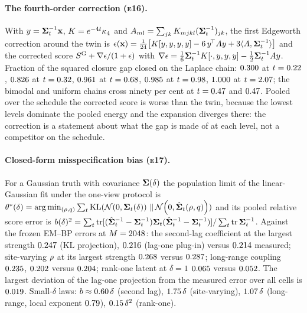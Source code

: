 \paragraph{The fourth-order correction (\textsc{e16}).}
With $y=\mathbf{\Sigma}_t^{-1}\mathbf{x}$, $K=e^{-4t}\kappa_4$ and $A_{ml}=\sum_{jk}K_{mjkl}(\mathbf{\Sigma}_t^{-1})_{jk}$,
the first Edgeworth correction around the twin is
$\epsilon(\mathbf{x})=\tfrac1{24}\bigl[K[y,y,y,y]-6\,y^{\!\top}Ay+3\langle A,\mathbf{\Sigma}_t^{-1}\rangle\bigr]$
and the corrected score $S^{\mathrm{G}}+\nabla\epsilon/(1+\epsilon)$ with
$\nabla\epsilon=\tfrac16\mathbf{\Sigma}_t^{-1}K[\cdot,y,y,y]-\tfrac12\mathbf{\Sigma}_t^{-1}Ay$. Fraction of the
squared closure gap closed on the Laplace chain: $0.300$ at
$t=0.22$, $0.826$ at
$t=0.32$, $0.961$ at
$t=0.68$, $0.985$ at
$t=0.98$, $1.000$ at
$t=2.07$; the bimodal and uniform chains cross ninety per cent at
$t=0.47$ and $0.47$. Pooled over the
schedule the corrected score is worse than the twin, because the lowest levels dominate
the pooled energy and the expansion diverges there: the correction is a statement about
what the gap is made of at each level, not a competitor on the schedule.

\paragraph{Closed-form misspecification bias (\textsc{e17}).}
For a Gaussian truth with covariance $\mathbf{\Sigma}(\delta)$ the population limit of the
linear-Gaussian fit under the one-view protocol is
$\theta^\ast(\delta)=\arg\min_{(\rho,q)}\sum_t\mathrm{KL}(\mathcal{N}\!\left(0,\mathbf{\Sigma}_t(\delta)\right)\,\|\,\mathcal{N}\!\left(0,\hat{\mathbf{\Sigma}}_t(\rho,q)\right))$
and its pooled relative score error is
$b(\delta)^2=\sum_t\operatorname{tr}[(\hat{\mathbf{\Sigma}}_t^{-1}-\mathbf{\Sigma}_t^{-1})\mathbf{\Sigma}_t(\hat{\mathbf{\Sigma}}_t^{-1}-\mathbf{\Sigma}_t^{-1})]/\sum_t\operatorname{tr}\mathbf{\Sigma}_t^{-1}$.
Against the frozen EM--BP errors at $M=2048$: the second-lag coefficient at the largest strength
$0.247$ (KL projection), $0.216$ (lag-one
plug-in) versus $0.214$ measured; site-varying $\rho$ at its
largest strength $0.268$ versus $0.287$;
long-range coupling $0.235$, $0.202$
versus $0.204$; rank-one latent at $\delta=1$
$0.065$ versus $0.052$. The largest deviation of the
lag-one projection from the measured error over all cells is
$0.019$. Small-$\delta$ laws: $b\approx0.60\,\delta$
(second lag), $1.75\,\delta$ (site-varying), $1.07\,\delta$
(long-range, local exponent $0.79$), $0.15\,\delta^2$
(rank-one).

